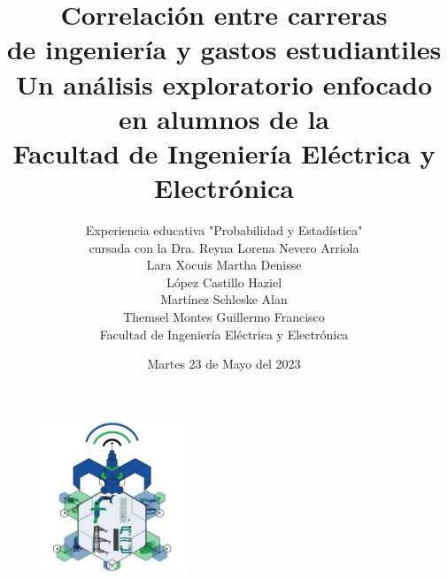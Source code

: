 \documentclass[letterpaper,12pt]{article}
\title{ \huge \textbf{Correlación entre carreras \\ de ingeniería y gastos estudiantiles} \\  \large Un análisis exploratorio enfocado en alumnos de la \\ Facultad de Ingeniería Eléctrica y Electrónica}
\author{Experiencia educativa "Probabilidad y Estadística" \\ cursada con la Dra. Reyna Lorena Nevero Arriola \\ Lara Xocuis Martha Denisse \\ López Castillo Haziel \\ Martínez Schleske Alan \\ Themsel Montes Guillermo Francisco \\ Facultad de Ingeniería Eléctrica y Electrónica }
\date{Martes 23 de Mayo del 2023}
\begin{document}
\maketitle
\thispagestyle{empty}

\begin{figure}[H]
    \centering
    \includegraphics[width=0.4\textwidth]{images/probabilidad/logo FIEE.jpg}
\end{figure}

\newpage

\setcounter{page}{1}
\pagestyle{headings}
\end{document}

